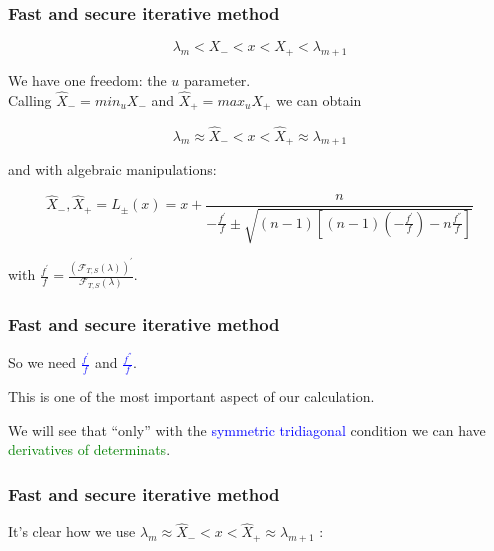 \documentclass{beamer}
\newcommand{\effe}[2]{\mathcal{F}_{#1}(#2)}
\theoremstyle{definition} \newtheorem{de}{Def}
\theoremstyle{remark} \newtheorem{os}[de]{Oss}
\theoremstyle{plain} \newtheorem{te}[de]{Teo}
\theoremstyle{plain} \newtheorem{co}[de]{Cor}
\theoremstyle{plain} \newtheorem{pr}[de]{Prop}
\theoremstyle{plain} \newtheorem{lem}[de]{Lemm}
\theoremstyle{remark} \newtheorem{rem}[de]{Remark}
\begin{document}
\begin{frame}
\frametitle{Fast and secure iterative method}

\begin{equation*}
  \lambda_m < X_{-} < x < X_{+} < \lambda_{m+1}
\end{equation*}

We have one freedom: the $u$ parameter. \\
Calling $\hat X_{-}=min_{u} X_{-}$ and $\hat X_{+}=max_{u} X_{+}$  we can obtain


\begin{equation*}
  \lambda_m \approx \hat X_{-} < x < \hat X_{+} \approx \lambda_{m+1}
\end{equation*}

and with algebraic manipulations: 

\begin{equation*}
  \hat X_{-}, \hat X_{+} = L_{\pm}(x) = x + \frac{ n }{ -\frac{f^{'}}{f} \pm \sqrt{(n-1)[ (n-1)(-\frac{f^{'}}{f}) -n\frac{f^{''}}{f} ]} }
\end{equation*}

with $\frac{f^{'}}{f}=\frac{ (\effe{T,S}{\lambda})^{'} }{ \effe{T,S}{\lambda} }$. 

\end{frame}


\begin{frame}
  \frametitle{Fast and secure iterative method}
  So we need \textcolor{blue}{$\frac{f^{'}}{f}$} and \textcolor{blue}{$\frac{f^{''}}{f}$}. \\

\pause

This is one of the most important aspect of our calculation. \\

\pause

We will see that ``only'' with the \textcolor{blue}{symmetric tridiagonal} condition we can have \textcolor{green}{derivatives of determinats}.
\end{frame}


\begin{frame}
\frametitle{Fast and secure iterative method}

It's clear how we use $\lambda_m \approx \hat X_{-} < x < \hat X_{+} \approx \lambda_{m+1}$ :


\end{frame}
\end{document}
